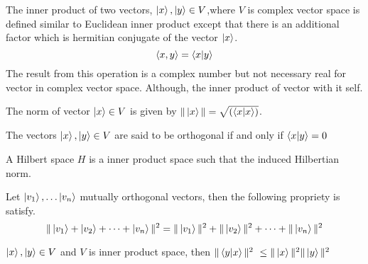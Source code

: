 \begin{defn}\label{Innerpro}

The inner product of two vectors, $\ket{x} ,\ket{y }\in V$,where $V$ is complex vector space is defined similar to Euclidean inner product except that there is an additional factor which is hermitian conjugate of the vector $\ket{x}$.
$$\left\langle x,y\right\rangle=\bra{x}\ket{y }$$
The result from this operation is a complex number but not necessary real for vector in complex vector space. Although, the inner product of vector with it self.
\end{defn}
\begin{defn}

The norm of vector $\ket{x} \in V$ is given by $\| \ket{x}\|=\sqrt{\left(\bra{x}\ket{x}\right)}$.
\end{defn}

\begin{defn}[Orthogonality]

The vectors $\ket{x}, \ket{y} \in V$ are said to be orthogonal if and only if $\bra{x}\ket{y}=0$
\end{defn}

\begin{defn}

A Hilbert space $H$ is a inner product space such that the induced Hilbertian norm.
\end{defn}

\begin{defn}[Pythagoras]

Let $\ket{v_1},\dots \ket{v_n}$ mutually orthogonal vectors, then the following propriety is satisfy.
$$\|\ket{v_1}+\ket{v_2}+\dots+\ket{v_n}\|^2=\|\ket{ v_1}\|^2+\| \ket{v_2}\|^2+\dots +\|\ket{ v_n}\|^2$$
\end{defn}

\begin{defn}\label{CSC}

$\ket{x}, \ket{y} \in V $  and $V$ is inner product space,
then $\|\bra{y}\ket{x}\|^2~\leq \|\ket{x} \|^2\|\ket{y}\|^2$
\end{defn}


